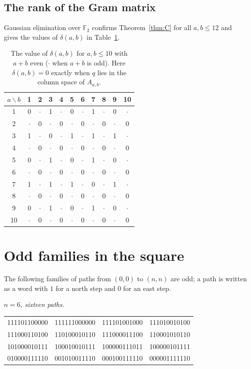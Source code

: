 \documentclass[11pt]{amsart}
\theoremstyle{definition}
\theoremstyle{remark}
\numberwithin{equation}{section}
\newcommand{\F}{\mathbb{F}}
\begin{document}
\subsection*{The rank of the Gram matrix}
Gaussian elimination over $\F_2$ confirms Theorem~\ref{thm:C} for all $a,b\le12$ and gives the values of $\delta(a,b)$ in Table~\ref{tab:delta}.

\begin{table}[ht]
\centering
\caption{The value of $\delta(a,b)$ for $a,b\le10$ with $a+b$ even ($\cdot$ when $a+b$ is odd). Here $\delta(a,b)=0$ exactly when $q$ lies in the column space of $A_{a,b}$.}
\label{tab:delta}
\small
\begin{tabular}{c|cccccccccc}
$a\backslash b$ & 1 & 2 & 3 & 4 & 5 & 6 & 7 & 8 & 9 & 10\\
\hline
1 & 0 & $\cdot$ & 1 & $\cdot$ & 0 & $\cdot$ & 1 & $\cdot$ & 0 & $\cdot$ \\
2 & $\cdot$ & 0 & $\cdot$ & 0 & $\cdot$ & 0 & $\cdot$ & 0 & $\cdot$ & 0 \\
3 & 1 & $\cdot$ & 0 & $\cdot$ & 1 & $\cdot$ & 1 & $\cdot$ & 1 & $\cdot$ \\
4 & $\cdot$ & 0 & $\cdot$ & 0 & $\cdot$ & 0 & $\cdot$ & 0 & $\cdot$ & 0 \\
5 & 0 & $\cdot$ & 1 & $\cdot$ & 0 & $\cdot$ & 1 & $\cdot$ & 0 & $\cdot$ \\
6 & $\cdot$ & 0 & $\cdot$ & 0 & $\cdot$ & 0 & $\cdot$ & 0 & $\cdot$ & 0 \\
7 & 1 & $\cdot$ & 1 & $\cdot$ & 1 & $\cdot$ & 0 & $\cdot$ & 1 & $\cdot$ \\
8 & $\cdot$ & 0 & $\cdot$ & 0 & $\cdot$ & 0 & $\cdot$ & 0 & $\cdot$ & 0 \\
9 & 0 & $\cdot$ & 1 & $\cdot$ & 0 & $\cdot$ & 1 & $\cdot$ & 0 & $\cdot$ \\
10 & $\cdot$ & 0 & $\cdot$ & 0 & $\cdot$ & 0 & $\cdot$ & 0 & $\cdot$ & 0 \\
\end{tabular}
\end{table}

\section{Odd families in the square}\label{app:families}

The following families of paths from $(0,0)$ to $(n,n)$ are odd; a path is written as a word with $1$ for a north step and $0$ for an east step.

\medskip\noindent\emph{$n=6$, sixteen paths.}
\begin{center}\small\ttfamily
\begin{tabular}{llll}
111101100000 & 111111000000 & 111101001000 & 111010010100 \\
111000110100 & 110100010110 & 111000011100 & 110001010110 \\
101000010111 & 100010010111 & 100000111011 & 100000101111 \\
010000111110 & 001010011110 & 000100111110 & 000001111110 \\
\end{tabular}
\end{center}
\end{document}
